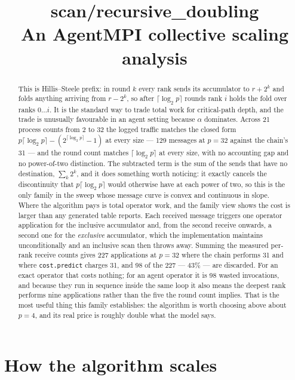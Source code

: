 \documentclass[11pt]{article}
\title{\textbf{scan/recursive\_doubling}\\[2pt]\large An AgentMPI collective scaling analysis}
\author{}
\date{}
\begin{document}
\maketitle

\begin{abstract}
This is Hillis--Steele prefix: in round $k$ every rank sends its accumulator to $r + 2^k$ and folds
anything arriving from $r - 2^k$, so after $\lceil\log_2 p\rceil$ rounds rank $i$ holds the fold
over ranks $0 \ldots i$. It is the standard way to trade total work for critical-path depth, and
the trade is unusually favourable in an agent setting because $\alpha$ dominates. Across 21
process counts from 2 to 32 the logged traffic matches the closed form
$p\lceil\log_2 p\rceil - (2^{\lceil\log_2 p\rceil} - 1)$ at every size --- 129 messages at $p=32$
against the chain's 31 --- and the round count matches $\lceil\log_2 p\rceil$ at every size, with
no accounting gap and no power-of-two distinction. The subtracted term is the sum of the sends
that have no destination, $\sum_k 2^k$, and it does something worth noticing: it exactly cancels
the discontinuity that $p\lceil\log_2 p\rceil$ would otherwise have at each power of two, so this
is the only family in the sweep whose message curve is convex and continuous in slope. Where the
algorithm pays is total operator work, and the family view shows the cost is larger than any
generated table reports. Each received message triggers one operator application for the inclusive
accumulator and, from the second receive onwards, a second one for the \emph{exclusive}
accumulator, which the implementation maintains unconditionally and an inclusive scan then throws
away. Summing the measured per-rank receive counts gives 227 applications at $p=32$ where the
chain performs 31 and where \texttt{cost.predict} charges 31, and 98 of the 227 --- 43\% --- are
discarded. For an exact operator that costs nothing; for an agent operator it is 98 wasted
invocations, and because they run in sequence inside the same loop it also means the deepest rank
performs nine applications rather than the five the round count implies. That is the most useful
thing this family establishes: the algorithm is worth choosing above about $p=4$, and its real
price is roughly double what the model says.
\end{abstract}



\section{How the algorithm scales}
\end{document}
